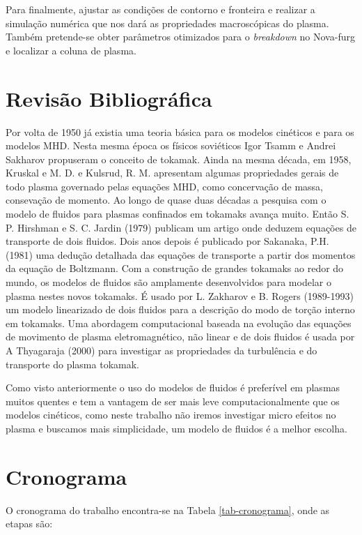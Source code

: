 \documentclass[12pt,oneside,a4paper]{abntex2}
\begin{document}
Para finalmente, ajustar as condições de contorno e fronteira e realizar a simulação numérica que nos dará as propriedades macroscópicas do plasma. Também pretende-se obter parâmetros otimizados para o \textit{breakdown} no Nova-furg e localizar a coluna de plasma.

\chapter{Revisão Bibliográfica}
Por volta de 1950 já existia uma teoria básica para os modelos cinéticos e para os modelos MHD. Nesta mesma época os físicos soviéticos Igor Tsamm e Andrei Sakharov propuseram o conceito de tokamak. Ainda na mesma década, em 1958, Kruskal e M. D. e Kulsrud, R. M. \cite{Kruskal1958} apresentam algumas propriedades gerais de todo plasma governado pelas equações MHD, como concervação de massa, consevação de momento. Ao longo de quase duas décadas a pesquisa com o modelo de fluidos para plasmas confinados em tokamaks avança muito. Então S. P. Hirshman e S. C. Jardin (1979) \cite{hirshman} publicam  um artigo onde deduzem equações de transporte de dois fluidos. Dois anos depois é publicado por Sakanaka, P.H. (1981)\cite{Sakanaka1981} uma dedução detalhada das equações de transporte a partir dos momentos da equação de Boltzmann. Com a construção de grandes tokamaks ao redor do mundo, os modelos de fluidos são amplamente desenvolvidos para modelar o plasma nestes novos tokamaks. É usado por L. Zakharov e B. Rogers \cite{Zakharov} (1989-1993) um modelo linearizado de dois fluidos para a descrição do modo de torção interno em tokamaks. Uma abordagem computacional baseada na evolução das equações de movimento de plasma eletromagnético, não linear e de dois fluidos é usada por A Thyagaraja (2000) \cite{Thyagaraja_2000} para investigar as propriedades da turbulência e do transporte do plasma tokamak. 

Como visto anteriormente o uso do modelos de fluidos é preferível em plasmas muitos quentes e tem a vantagem de ser mais leve computacionalmente que os modelos cinéticos, como neste trabalho não iremos investigar micro efeitos no plasma e buscamos mais simplicidade, um modelo de fluidos é a melhor escolha. 

\chapter{Cronograma}
O cronograma do trabalho encontra-se na Tabela \ref{tab-cronograma}, onde as etapas são:
\end{document}
